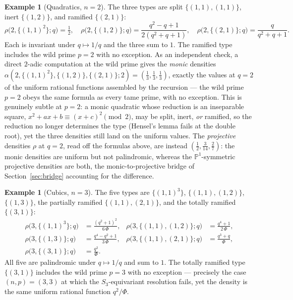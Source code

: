 \documentclass[pdflatex,sn-mathphys-num]{sn-jnl}%
\newcommand{\bbP}{\mathbb{P}}
\theoremstyle{plain}
\theoremstyle{definition}
\newtheorem{example}[theorem]{Example}
\theoremstyle{remark}
\numberwithin{equation}{section}
\begin{document}
\begin{example}[Quadratics, $n=2$]\label{ex:n2}
The three types are split $\{(1,1),(1,1)\}$, inert $\{(1,2)\}$, and ramified
$\{(2,1)\}$:
\[
  \rho\bigl(2,\{(1,1)^{2}\};q\bigr)=\tfrac12,\quad
  \rho\bigl(2,\{(1,2)\};q\bigr)=\frac{q^{2}-q+1}{2(q^{2}+q+1)},\quad
  \rho\bigl(2,\{(2,1)\};q\bigr)=\frac{q}{q^{2}+q+1}.
\]
Each is invariant under $q\mapsto 1/q$ and the three sum to $1$. The ramified type
includes the wild prime $p=2$ with no exception. As an independent check, a direct
$2$-adic computation at the wild prime gives the \emph{monic} densities
$\alpha(2,\{(1,1)^2\},\{(1,2)\},\{(2,1)\};2)=(\tfrac13,\tfrac13,\tfrac13)$, exactly the
values at $q=2$ of the uniform rational functions assembled by the recursion --- the
wild prime $p=2$ obeys the same formula as every tame prime, with no exception. This is
genuinely subtle at $p=2$: a monic quadratic whose reduction is an inseparable square,
$x^2+ax+b\equiv(x+c)^2\pmod 2$, may be split, inert, \emph{or} ramified, so the
reduction no longer determines the type (Hensel's lemma fails at the double root), yet
the three densities still land on the uniform values. The \emph{projective} densities
$\rho$ at $q=2$, read off the formulas above, are instead $(\tfrac12,\tfrac3{14},\tfrac27)$:
the monic densities are uniform but not palindromic, whereas the $\bbP^{1}$-symmetric
projective densities are both, the monic-to-projective bridge of
Section~\ref{sec:bridge} accounting for the difference.
\end{example}

\begin{example}[Cubics, $n=3$]\label{ex:n3}
The five types are $\{(1,1)^{3}\}$, $\{(1,1),(1,2)\}$, $\{(1,3)\}$, the partially
ramified $\{(1,1),(2,1)\}$, and the totally ramified $\{(3,1)\}$:
\[
\begin{aligned}
  \rho\bigl(3,\{(1,1)^{3}\};q\bigr)&=\frac{(q^{2}+1)^{2}}{6\,\Phi}, &
  \rho\bigl(3,\{(1,1),(1,2)\};q\bigr)&=\frac{q^{4}+1}{2\,\Phi},\\[0.3em]
  \rho\bigl(3,\{(1,3)\};q\bigr)&=\frac{q^{4}-q^{2}+1}{3\,\Phi}, &
  \rho\bigl(3,\{(1,1),(2,1)\};q\bigr)&=\frac{q^{3}+q}{\Phi},\\[0.3em]
  \rho\bigl(3,\{(3,1)\};q\bigr)&=\frac{q^{2}}{\Phi}. & &
\end{aligned}
\]
All five are palindromic under $q\mapsto 1/q$ and sum to $1$. The totally ramified
type $\{(3,1)\}$ includes the wild prime $p=3$ with no exception --- precisely the
case $(n,p)=(3,3)$ at which the $S_{3}$-equivariant resolution fails, yet the
density is the same uniform rational function $q^{2}/\Phi$.
\end{example}
\end{document}
